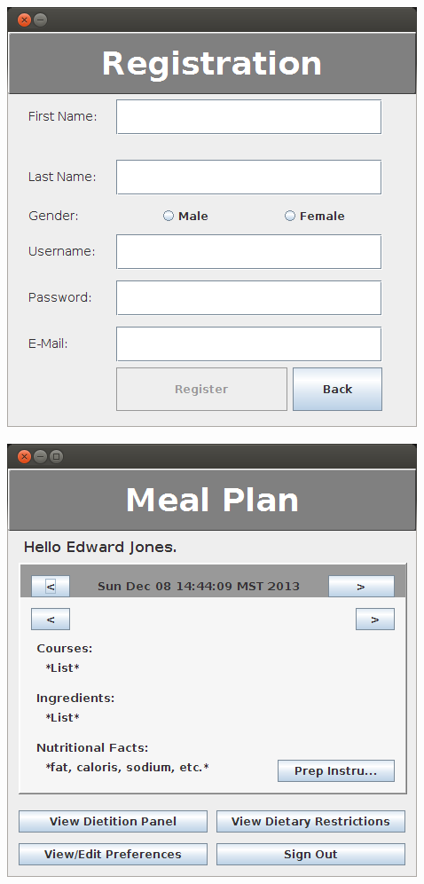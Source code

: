 \documentclass[a4paper,10pt,toc=graduated]{article}
\begin{document}
\begin{appendices}
\includegraphics{screenshots/frmRegistration.png}

\includegraphics{screenshots/frmUserMain.png}


\end{appendices}
\end{document}
